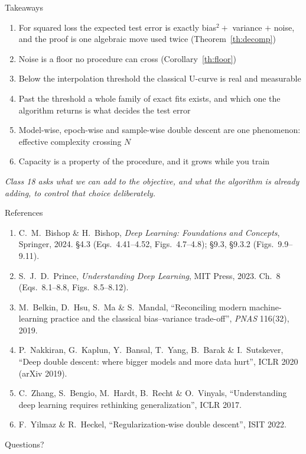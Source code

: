 \documentclass[aspectratio=169, 11pt]{beamer}
\newcommand{\bridge}[1]{%
  {\scriptsize\itshape\color{mcMuted} #1\par}\vspace{0.35em}}
\begin{document}
\begin{frame}{Takeaways}
  \vspace{0.1em}
  {\scriptsize
  \begin{enumerate}\itemsep0.34em
    \item For squared loss the expected test error is exactly
          bias$^2 +$ variance $+$ noise, and the proof is one algebraic
          move used twice (Theorem~\ref{th:decomp})
    \item Noise is a floor no procedure can cross
          (Corollary~\ref{th:floor})
    \item Below the interpolation threshold the classical U-curve is
          real and measurable
    \item Past the threshold a whole family of exact fits exists, and
          which one the algorithm returns is what decides the test error
    \item Model-wise, epoch-wise and sample-wise double descent are one
          phenomenon: effective complexity crossing $N$
    \item Capacity is a property of the procedure, and it grows while
          you train
  \end{enumerate}}
  \bridge{Class 18 asks what we can add to the objective, and what the
  algorithm is already adding, to control that choice deliberately.}
\end{frame}

\begin{frame}[allowframebreaks]{References}
  \vspace{0.3em}
  {\scriptsize
  \begin{enumerate}\itemsep0.30em
    \item C.\ M.\ Bishop \& H.\ Bishop, \emph{Deep Learning: Foundations
          and Concepts}, Springer, 2024. \S4.3 (Eqs.~4.41--4.52,
          Figs.~4.7--4.8); \S9.3, \S9.3.2 (Figs.~9.9--9.11).
    \item S.\ J.\ D.\ Prince, \emph{Understanding Deep Learning}, MIT
          Press, 2023. Ch.~8 (Eqs.~8.1--8.8, Figs.~8.5--8.12).
    \item M.\ Belkin, D.\ Hsu, S.\ Ma \& S.\ Mandal, ``Reconciling
          modern machine-learning practice and the classical
          bias--variance trade-off'', \emph{PNAS} 116(32), 2019.
    \item P.\ Nakkiran, G.\ Kaplun, Y.\ Bansal, T.\ Yang, B.\ Barak \&
          I.\ Sutskever, ``Deep double descent: where bigger models and
          more data hurt'', ICLR 2020 (arXiv 2019).
    \item C.\ Zhang, S.\ Bengio, M.\ Hardt, B.\ Recht \& O.\ Vinyals,
          ``Understanding deep learning requires rethinking
          generalization'', ICLR 2017.
    \item F.\ Yilmaz \& R.\ Heckel, ``Regularization-wise double
          descent'', ISIT 2022.
  \end{enumerate}}
\end{frame}

\begin{frame}[standout]
  Questions?
\end{frame}
\end{document}
